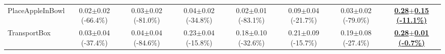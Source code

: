 \begin{table}[htbp]
\begin{adjustbox}{max width=\textwidth}
\begin{tabular}{l*{7}{c}}
PlaceAppleInBowl & 0.02$\pm$0.02 \scriptsize{(-66.4\%)} & 0.03$\pm$0.02 \scriptsize{(-81.0\%)} & 0.04$\pm$0.02 \scriptsize{(-34.8\%)} & 0.02$\pm$0.01 \scriptsize{(-83.1\%)} & 0.09$\pm$0.04 \scriptsize{(-21.7\%)} & 0.03$\pm$0.02 \scriptsize{(-79.0\%)} & \textbf{\underline{0.28$\pm$0.15 \scriptsize{(-11.1\%)}}} \\
TransportBox & 0.03$\pm$0.04 \scriptsize{(-37.4\%)} & 0.04$\pm$0.04 \scriptsize{(-84.6\%)} & 0.23$\pm$0.04 \scriptsize{(-15.8\%)} & 0.18$\pm$0.10 \scriptsize{(-32.6\%)} & 0.21$\pm$0.09 \scriptsize{(-15.7\%)} & 0.19$\pm$0.08 \scriptsize{(-27.4\%)} & \textbf{\underline{0.28$\pm$0.01 \scriptsize{(-0.7\%)}}} \\
\bottomrule
\end{tabular}
\end{adjustbox}
\end{table}

